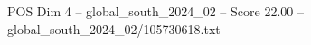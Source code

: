 \begin{textsample}{POS Dim 4 – global\_south\_2024\_02 – Score 22.00 – global\_south\_2024\_02/105730618.txt}
\end{textsample}
